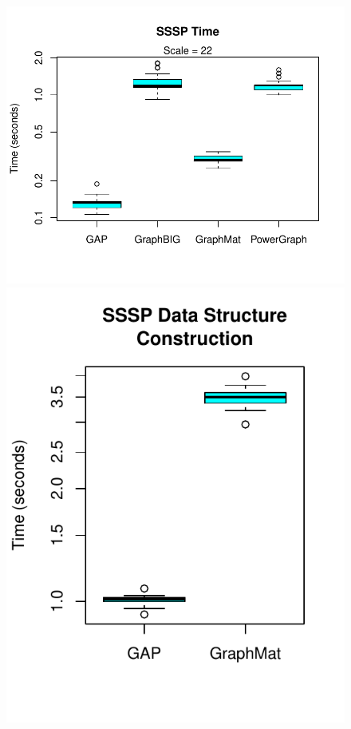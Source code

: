 \documentclass{llncs}
\begin{document}
\begin{figure}
	\centering
	\begin{minipage}{0.59\linewidth}
		\includegraphics[width=\linewidth, trim=0 36pt 18pt 0, clip]{graphics/sssp_time.pdf}
	\end{minipage}
	\begin{minipage}{0.365\linewidth}
		\includegraphics[width=\linewidth, trim=0 36pt 18pt 0, clip]{graphics/sssp_dsc.pdf}

\end{minipage}
\end{figure}
\end{document}
